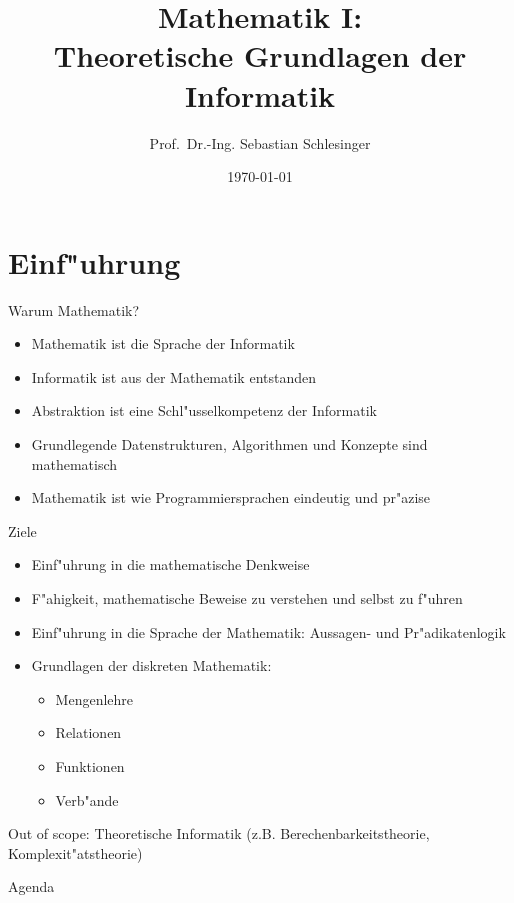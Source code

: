 \documentclass{beamer}
\title[Mathematik I]{Mathematik I: \\Theoretische Grundlagen der Informatik}
\author{Prof.\ Dr.-Ing. Sebastian Schlesinger}
\date{\today}
\begin{document}
 \begin{frame}
\titlepage
\end{frame}

\section{Einf"uhrung}
\begin{frame}{Warum Mathematik?}
  \begin{itemize}
    \item Mathematik ist die Sprache der Informatik
    \item Informatik ist aus der Mathematik entstanden
    \item Abstraktion ist eine Schl"usselkompetenz der Informatik
    \item Grundlegende Datenstrukturen, Algorithmen und Konzepte sind mathematisch
    \item Mathematik ist wie Programmiersprachen eindeutig und pr"azise
  \end{itemize}
\end{frame}

\begin{frame}{Ziele}
  \begin{itemize}
    \item Einf"uhrung in die mathematische Denkweise
    \item F"ahigkeit, mathematische Beweise zu verstehen und selbst zu f"uhren
    \item Einf"uhrung in die Sprache der Mathematik: Aussagen- und Pr"adikatenlogik \pause
    \item Grundlagen der diskreten Mathematik:
    \begin{itemize}
      \item Mengenlehre
      \item Relationen
      \item Funktionen
      \item Verb"ande
    \end{itemize}
  \end{itemize}\pause
  Out of scope: Theoretische Informatik (z.B. Berechenbarkeitstheorie, Komplexit"atstheorie)

\end{frame}
\begin{frame}{Agenda}
  \tableofcontents
  \end{frame}
  
\end{document}
